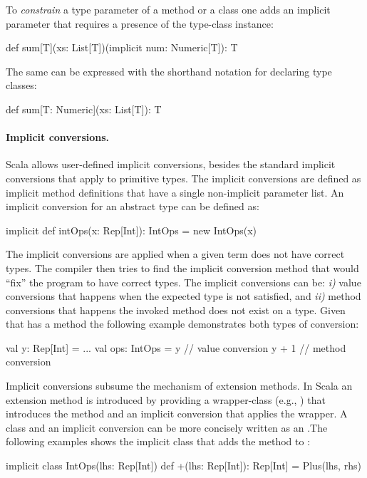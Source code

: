  To \emph{constrain} a type parameter of a method or a class one adds an implicit parameter
  that requires a presence of the type-class instance:\begin{lstparagraph}
def sum[T](xs: List[T])(implicit num: Numeric[T]): T
\end{lstparagraph}
The same can be expressed with the shorthand notation for declaring type classes:\begin{lstparagraph}
def sum[T: Numeric](xs: List[T]): T
\end{lstparagraph}

\paragraph{Implicit conversions.} Scala allows user-defined implicit conversions, besides the standard implicit conversions
 that apply to primitive types. The implicit conversions are defined as implicit method definitions
 that have a single non-implicit parameter list. An implicit conversion for an abstract type 
 can be defined as:\begin{lstparagraph}
implicit def intOps(x: Rep[Int]): IntOps = new IntOps(x)
\end{lstparagraph}

The implicit conversions are applied when a given term does not have correct types. The compiler then
tries to find the implicit conversion method that would ``fix'' the program to have correct types. The
implicit conversions can be: \emph{i)} value conversions that happens when the expected type
is not satisfied, and \emph{ii)} method conversions that happens the invoked method does not exist
on a type. Given that  has a method \code{+} the following example demonstrates both types
of conversion:\begin{lstparagraph}
val y: Rep[Int] = ...
val ops: IntOps = y // value conversion
y + 1               // method conversion
\end{lstparagraph}


 Implicit conversions subsume the mechanism of extension methods. In Scala an
 extension method is introduced by providing a wrapper-class (e.g., ) that introduces the method and an implicit conversion that applies the wrapper. A class and an implicit conversion can be more concisely written as an .The following examples shows the implicit class that adds the \code{+} method to :\begin{lstparagraph}
 implicit class IntOps(lhs: Rep[Int]) {
   def +(lhs: Rep[Int]): Rep[Int] = Plus(lhs, rhs)
 }
 \end{lstparagraph}




